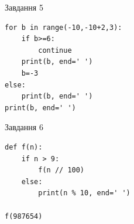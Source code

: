 \documentclass[12pt, ukrainian]{article}
\begin{document}
{\vspace{15mm}
\begin{minipage}[t]{9.7cm}                
{\begin{center}Завдання {5}\end{center}}
\begin{verbatim}
for b in range(-10,-10+2,3):
    if b>=6:
        continue
    print(b, end=' ')
    b=-3
else:
    print(b, end=' ')
print(b, end=' ')
\end{verbatim}     
\end{minipage}
\vline \hspace{8mm}
\begin{minipage}[t]{8.0cm}                
{\begin{center}Завдання {6}\end{center}}
\begin{verbatim}
def f(n):
    if n > 9:
        f(n // 100)
    else:
        print(n % 10, end=' ')

f(987654)
\end{verbatim}     
\end{minipage}

}
\newpage
\end{document}
